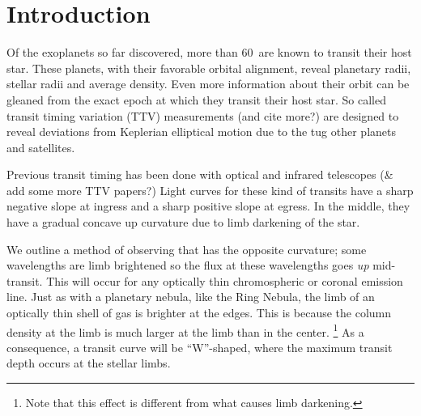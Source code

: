 \documentclass[twocolumn]{emulateapj}
\newcommand{\numt}{60}
\begin{document}

\section{Introduction}
Of the exoplanets so far discovered, more than \numt\ are known to
transit their host star. These planets, with their favorable orbital
alignment, reveal planetary radii, stellar radii and average
density. Even more information about their orbit can be gleaned from
the exact epoch at which they transit their host star. So called
transit timing variation (TTV) measurements
\citep{2005MNRAS.359..567A} (and cite more?) are designed to reveal
deviations from Keplerian elliptical motion due to the tug other
planets and satellites.

Previous transit timing has been done with optical and infrared
telescopes \citep{2004ApJ...613L.153A,2010A&A...510A.107M} (\& add
some more TTV papers?) Light curves for these kind of transits have a
sharp negative slope at ingress and a sharp positive slope at
egress. In the middle, they have a gradual concave up curvature due to limb darkening of the star.

We outline a method of observing that has the opposite curvature; some
wavelengths are limb brightened so the flux at these wavelengths goes
{\it up} mid-transit. This will occur for any optically thin
chromospheric or coronal emission line. Just as with a planetary
nebula, like the Ring Nebula, the limb of an optically thin shell of
gas is brighter at the edges. This is because the column density at
the limb is much larger at the limb than in the center. \footnote{Note
that this effect is different from what causes limb darkening.} As a
consequence, a transit curve will be ``W''-shaped, where the maximum
transit depth occurs at the stellar limbs.
\end{document}
